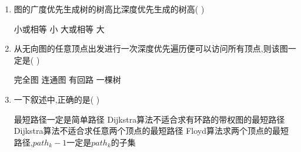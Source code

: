 \documentclass[12pt, a4paper, oneside, UTF8]{ctexbook}
\begin{document}
\begin{enumerate}
    \item 图的广度优先生成树的树高比深度优先生成的树高(    ) 
    \begin{choices}
        \task 小或相等
        \task 小 
        \task 大或相等 
        \task 大
    \end{choices}


    \item 从无向图的任意顶点出发进行一次深度优先遍历便可以访问所有顶点,则该图一定是(   ) \\
    \begin{choices}
        \task 完全图 
        \task 连通图 
        \task 有回路 
        \task 一棵树 
    \end{choices}


    \item 一下叙述中,正确的是(   ) 
    \begin{choices}[1]
        \task 最短路径一定是简单路径
        \task Dijkstra算法不适合求有环路的带权图的最短路径
        \task Dijkstra算法不适合求任意两个顶点的最短路径 
        \task Floyd算法求两个顶点的最短路径,$path_k-1$一定是$path_k$的子集 
    \end{choices}


\end{enumerate}
\end{document}
